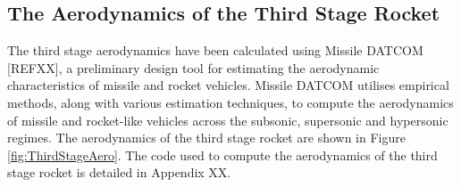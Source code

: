 		
		

		\subsection{The Aerodynamics of the Third Stage Rocket}\label{sec:thirdstageaero}
		
		The third stage aerodynamics have been calculated using Missile DATCOM [REFXX], a preliminary design tool for estimating the aerodynamic characteristics of missile and rocket vehicles. Missile DATCOM utilises empirical methods, along with various estimation techniques, to compute the aerodynamics of missile and rocket-like vehicles across the subsonic, supersonic and hypersonic regimes. The aerodynamics of the third stage rocket are shown in Figure \ref{fig:ThirdStageAero}. The code used to compute the aerodynamics of the third stage rocket is detailed in Appendix XX.  
		
